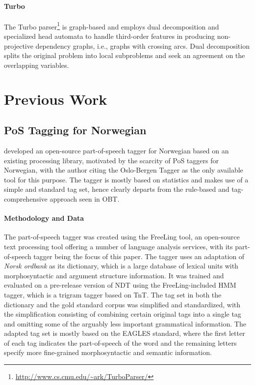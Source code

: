 \documentclass[a4paper,12pt,english]{book}
\begin{document}
\paragraph{Turbo}
The Turbo parser\footnote{\url{http://www.cs.cmu.edu/~ark/TurboParser/}}
\cite{Mar:Alm:Smi:13} is graph-based and employs dual decomposition and
specialized head automata to handle third-order features in producing
non-projective dependency graphs, i.e., graphs with crossing arcs.  Dual
decomposition splits the original problem into local subproblems and seek an
agreement on the overlapping variables.

\section{Previous Work}
\subsection{PoS Tagging for Norwegian}
 developed an open-source part-of-speech tagger for Norwegian
based on an existing processing library, motivated by the scarcity of PoS
taggers for Norwegian, with the author citing the Oslo-Bergen Tagger
\cite{Hag:Joh:Nok:00} as the only available tool for this purpose. The tagger
is mostly based on statistics and makes use of a simple and standard tag set,
hence clearly departs from the rule-based and tag-comprehensive approach seen
in OBT.

\paragraph{Methodology and Data}
The part-of-speech tagger was created using the FreeLing tool, an open-source
text processing tool offering a number of language analysis services, with its
part-of-speech tagger being the focus of this paper. The tagger uses an
adaptation of \emph{Norsk ordbank} as its dictionary, which is a large database
of lexical units with morphosyntactic and argument structure information. It
was trained and evaluated on a pre-release version of NDT using the
FreeLing-included HMM tagger, which is a trigram tagger based on TnT. The tag
set in both the dictionary and the gold standard corpus was simplified and
standardized, with the simplification consisting of combining certain original
tags into a single tag and omitting some of the arguably less important
grammatical information.
The adapted tag set is mostly based on the EAGLES standard, where the first
letter of each tag indicates the part-of-speech of the word and the remaining
letters specify more fine-grained morphosyntactic and semantic information.
\end{document}
